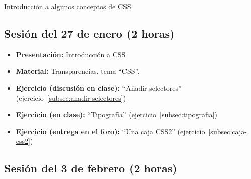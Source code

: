 \documentclass[a4paper,12pt]{report}
\begin{document}
Introducción a algunos conceptos de CSS.

\subsection{Sesión del 27 de enero (2 horas)}

\begin{itemize}
\item \textbf{Presentación:} Introducción a CSS
\item \textbf{Material:} Transparencias, tema ``CSS''.
\item \textbf{Ejercicio (discusión en clase):} ``Añadir selectores'' (ejercicio~\ref{subsec:anadir-selectores})
\item \textbf{Ejercicio (en clase):} ``Tipografía'' (ejercicio~\ref{subsec:tipografia})
\item \textbf{Ejercicio (entrega en el foro):} ``Una caja CSS2'' (ejercicio~\ref{subsec:caja-css2})
\end{itemize}

\subsection{Sesión del 3 de febrero (2 horas)}
\end{document}
